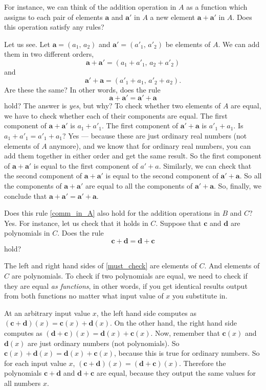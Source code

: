 \documentclass[a4paper,11pt]{book}
\theoremstyle{definition}
\newcommand{\be}{\begin{equation}}
\newcommand{\ee}{\end{equation}}
\newcommand{\ve}[1]{\mathbf{#1}}
\begin{document}
For instance, we can think of the addition operation in $A$ as a function which assigns to each pair of elements $\ve{a}$ and $\ve{a}'$ in $A$ a new element $\ve{a} + \ve{a}'$ in $A$. Does this operation satisfy any rules?

Let us see. Let $\ve{a} = (a_1, \,a_2)$ and $\ve{a}' = (a'_1, \, a'_2)$ be elements of $A$. We can add them in two different orders,
\[
 \ve{a} + \ve{a}' = (a_1 + a'_1, \, a_2 + a'_2)
\]
and
\[
 \ve{a}' + \ve{a} = (a'_1 + a_1, \, a'_2 + a_2) .
\]
Are these the same? In other words, does the rule 
\be \label{comm_in_A}
\ve{a} + \ve{a}' = \ve{a}' + \ve{a}
\ee 
hold? The answer is {\em yes}, but why? To check whether two elements of $A$ are equal, we have to check whether each of their components are equal. The first component of $\ve{a} + \ve{a}'$ is $a_1 + a'_1$. The first component of $\ve{a}' + \ve{a}$ is $a'_1 + a_1$. Is $a_1 + a'_1 = a'_1 + a_1$? Yes --- because these are just ordinary real numbers (not elements of $A$ anymore), and we know that for ordinary real numbers, you can add them together in either order and get the same result. So the first component of $\ve{a} + \ve{a}'$ is equal to the first component of $a'+ a$. Similarly, we can check that the second component of $\ve{a} + \ve{a}'$ is equal to the second component of $\ve{a}' + \ve{a}$. So all the components of $\ve{a} + \ve{a}'$ are equal to all the components of $\ve{a}' + \ve{a}$. So, finally, we conclude that $\ve{a} + \ve{a}' = \ve{a}' + \ve{a}$.

Does this rule \eqref{comm_in_A} also hold for the addition operations in $B$ and $C$?  Yes. For instance, let us check that it holds in $C$. Suppose that $\ve{c}$ and $\ve{d}$ are polynomials in $C$.  Does the rule
\be
 \ve{c} + \ve{d} = \ve{d} + \ve{c} \label{must_check}
\ee
hold? 

The left and right hand sides of \eqref{must_check} are elements of $C$. And elements of $C$ are polynomials. To check if two polynomials are equal, we need to check if they are equal {\em as functions}, in other words, if you get identical results output from both functions no matter what input value of $x$ you substitute in. 

At an arbitrary input value $x$, the left hand side computes as $(\ve{c} + \ve{d})(x) = \ve{c}(x) + \ve{d}(x)$. On the other hand, the right hand side computes as $(\ve{d} + \ve{c})(x) = \ve{d}(x) + \ve{c}(x)$. Now, remember that $\ve{c}(x)$ and $\ve{d}(x)$ are just ordinary numbers (not polynomials). So $\ve{c}(x) + \ve{d}(x) = \ve{d}(x) + \ve{c}(x)$, because this is true for ordinary numbers. So for each input value $x$, $(\ve{c} + \ve{d}) (x) = (\ve{d} + \ve{c})(x)$. Therefore the polynomials $\ve{c} + \ve{d}$ and $\ve{d} + \ve{c}$ are equal, because they output the same values for all numbers $x$.
\end{document}
